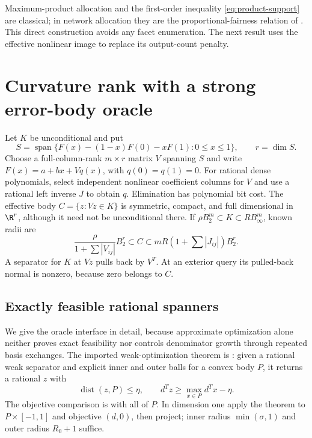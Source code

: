 Maximum-product allocation and the first-order inequality
\eqref{eq:product-support} are classical; in network allocation they
are the proportional-fairness relation of \citet[Section 2]{kelly1998}.
This direct construction avoids any facet enumeration. The next result
uses the effective nonlinear image to replace its output-count penalty.

\section{Curvature rank with a strong error-body oracle}\label{sec:vector-oracle}

Let $K$ be unconditional and put
\begin{equation}\label{eq:nonlinear-output-image}
 S=\operatorname{span}\{F(x)-(1-x)F(0)-xF(1):0\le x\le1\},
 \qquad r=\dim S.
\end{equation}
Choose a full-column-rank $m\times r$ matrix $V$ spanning $S$ and write
$F(x)=a+bx+Vq(x)$, with $q(0)=q(1)=0$.
For rational dense polynomials, select independent nonlinear coefficient
columns for $V$ and use a rational left inverse $J$ to obtain $q$.
Elimination has polynomial bit cost. The effective body
$C=\{z:Vz\in K\}$ is symmetric, compact, and full dimensional in
$\R^r$, although it need not be unconditional there.
If $\rho B_2^m\subset K\subset R B_\infty^m$, known radii are
\begin{equation}\label{eq:effective-body-radii}
 \frac{\rho}{1+\sum|V_{ij}|}B_2^r\subset C
 \subset mR(1+\sum|J_{ij}|)B_2^r.
\end{equation}
A separator for $K$ at $Vz$ pulls back by $V^T$. At an exterior query
its pulled-back normal is nonzero, because zero belongs to $C$.

\subsection{Exactly feasible rational spanners}

We give the oracle interface in detail, because approximate optimization
alone neither proves exact feasibility nor controls denominator growth
through repeated basis exchanges. The imported weak-optimization theorem
is \citet[Definition (5), Theorem (3.1)]{gls1981}: given a rational weak
separator and explicit inner and outer balls for a convex body $P$, it
returns a rational $z$ with
\begin{equation}\label{eq:weak-opt-spanner}
 \operatorname{dist}(z,P)\le\eta,
 \qquad d^Tz\ge\max_{x\in P}d^Tx-\eta.
\end{equation}
The objective comparison is with all of $P$. In dimension one apply the
theorem to $P\times[-1,1]$ and objective $(d,0)$, then project; inner
radius $\min(\sigma,1)$ and outer radius $R_0+1$ suffice.


